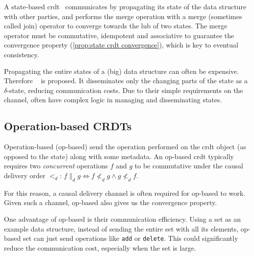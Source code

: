 A state-based 
\acrshort{crdt}~\cite{vanderlinde2016delta-CRDTs,almeida2018DeltaCRDT,shapiro2011CRDT,preguica2018CRDT} communicates by propagating its state of 
the data structure with other parties, and performs the merge operation with a merge
(sometimes called join) operator to converge towards the \acrfull{lub} of
two states. The merge operator must be commutative, idempotent and
associative to guarantee the convergence property (\cref{prop:state crdt convergence}),
which is key to eventual consistency.


Propagating the entire states of a (big) data structure can often be expensive.
Therefore ~\cite{almeida2018DeltaCRDT} is proposed. It
disseminates only the changing parts of the state as 
a \(\delta\)-state, reducing communication costs.
Due to their simple requirements on the channel,  often
have complex logic in managing and disseminating states.


\subsection{Operation-based CRDTs} \label{subsec:bg op-based crdts}

Operation-based (op-based)  send the operation performed on 
the \acrshort{crdt} object (as opposed to the state) along with some metadata.
An op-based \acrshort{crdt} typically requires two \emph{concurrent}
operations \(f\) and \(g\) to 
be commutative under the causal delivery order \(<_d\): 
\(f \parallel_d g \iff f\not <_d g \land g\not <_d f\). 

For this reason, a causal delivery channel is often required for op-based
 to work. Given such a channel,  op-based 
also gives us the convergence property.


One advantage of op-based  is their communication efficiency.
Using a set as an example data structure, instead of sending the
entire set with all its elements,
op-based set can just send operations like \texttt{add} or \texttt{delete}.
This could significantly reduce the communication cost, especially when the set 
is large.

